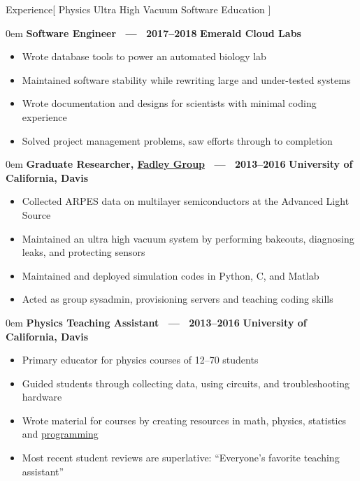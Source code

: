 \documentclass[11pt,a4paper]{article}
\newenvironment{headedsection}[2]{
    \begin{addmargin}[0.5em]{0em}
    {\large\bfseries #1} \hfill {\bfseries #2}%
    \begin{itemize}
        [label={}, topsep=0pt, itemsep=1.5pt, parsep=0pt, leftmargin=1.5em]
}{
    \end{itemize}
    \end{addmargin}
    \medskip
}
\begin{document}
\sloppy  %


\vspace{1em}

\begin{mysection}{Experience}[
Physics
\textbullet{} Ultra High Vacuum
\textbullet{} Software
\textbullet{} Education
]

    \begin{headedsection}
        {Software Engineer \ --- \ 2017--2018}{Emerald Cloud Labs}

        \item Wrote database tools to power an automated biology lab
        \item Maintained software stability while rewriting large and
            under-tested systems
        \item Wrote documentation and designs for scientists with minimal coding experience
        \item Solved project management problems, saw efforts through to
            completion
    \end{headedsection}

    \begin{headedsection}
          {Graduate Researcher, \href{http://www.physics.ucdavis.edu/fadleygroup/}{Fadley Group}
             \ --- \ 2013--2016}
          {University of California, Davis}

        \item Collected ARPES data on multilayer semiconductors at the Advanced Light Source
        \item Maintained an ultra high vacuum system by performing bakeouts, diagnosing leaks, and protecting sensors
        \item Maintained and deployed simulation codes in Python, C, and Matlab
        \item Acted as group sysadmin, provisioning servers and teaching coding
             skills
    \end{headedsection}

    \begin{headedsection}
          {Physics Teaching Assistant  \ --- \ 2013--2016}
          {University of California, Davis}

        \item Primary educator for physics courses of 12--70 students
        \item Guided students through collecting data, using circuits, and troubleshooting hardware
        \item Wrote material for courses by creating resources in math, physics,
            statistics and
            \href{https://github.com/jgarst/AdvancedLab/releases/download/spring_2016/Python-FirstSteps.pdf}
                {programming}
        \item Most recent student reviews are superlative:
            ``Everyone's favorite teaching assistant''
    \end{headedsection}


\end{mysection}
\end{document}

